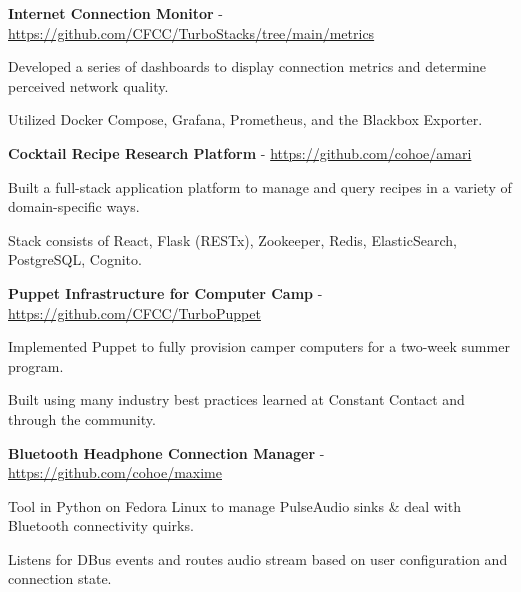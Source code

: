 \documentclass[10pt]{article}
\newcommand{\halfblankline}{\quad\vspace{-0.5\baselineskip}\pagebreak[3]}
\begin{document}
\textbf{Internet Connection Monitor} - \href{https://github.com/CFCC/TurboStacks/tree/main/metrics}{https://github.com/CFCC/TurboStacks/tree/main/metrics}
\begin{outerlist}
    \item[]
            \begin{innerlist}
		\item Developed a series of dashboards to display connection metrics and determine perceived network quality.
                \item Utilized Docker Compose, Grafana, Prometheus, and the Blackbox Exporter.
            \end{innerlist}
\end{outerlist}
\halfblankline

\textbf{Cocktail Recipe Research Platform} - \href{https://github.com/cohoe/amari}{https://github.com/cohoe/amari}
\begin{outerlist}
    \item[]
            \begin{innerlist}
                \item Built a full-stack application platform to manage and query recipes in a variety of domain-specific ways.
                \item Stack consists of React, Flask (RESTx), Zookeeper, Redis, ElasticSearch, PostgreSQL, Cognito.
            \end{innerlist}
\end{outerlist}
\halfblankline

\textbf{Puppet Infrastructure for Computer Camp} - \href{https://github.com/CFCC/TurboPuppet}{https://github.com/CFCC/TurboPuppet}
\begin{outerlist}
    \item[]
            \begin{innerlist}
                \item Implemented Puppet to fully provision camper computers for a two-week summer program.
		 \item Built using many industry best practices learned at Constant Contact and through the community.
            \end{innerlist}
\end{outerlist}
\halfblankline

\textbf{Bluetooth Headphone Connection Manager} - \href{https://github.com/cohoe/maxime}{https://github.com/cohoe/maxime}
\begin{outerlist}
    \item[]
            \begin{innerlist}
                \item Tool in Python on Fedora Linux to manage PulseAudio sinks \& deal with Bluetooth connectivity quirks.
                \item Listens for DBus events and routes audio stream based on user configuration and connection state.
            \end{innerlist}
\end{outerlist}
\halfblankline
\end{document}
